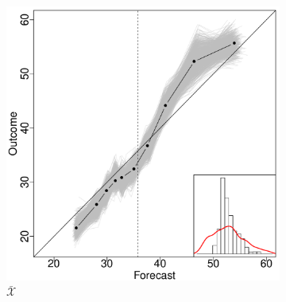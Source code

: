 \documentclass[11pt]{article}
\theoremstyle{definition}
\theoremstyle{definition}
\begin{document}
\begin{figure}
        \centering
        ~ %
        \begin{subfigure}[b]{0.323\textwidth}
                \includegraphics[width=\textwidth]{DependentELP}
                \caption{$\bar{\mathcal{X}}$}
                \label{fig:mouse}
        \end{subfigure}     
                \begin{subfigure}[b]{0.323\textwidth}

\end{subfigure}
\end{figure}
\end{document}
